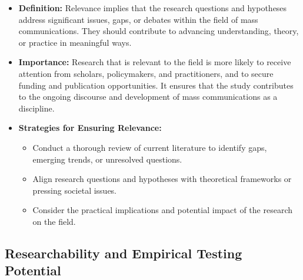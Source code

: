 \documentclass[
]{book}
\providecommand{\tightlist}{%
  \setlength{\itemsep}{0pt}\setlength{\parskip}{0pt}}
\begin{document}
\begin{itemize}
\item
  \textbf{Definition:} Relevance implies that the research questions and hypotheses address significant issues, gaps, or debates within the field of mass communications. They should contribute to advancing understanding, theory, or practice in meaningful ways.
\item
  \textbf{Importance:} Research that is relevant to the field is more likely to receive attention from scholars, policymakers, and practitioners, and to secure funding and publication opportunities. It ensures that the study contributes to the ongoing discourse and development of mass communications as a discipline.
\item
  \textbf{Strategies for Ensuring Relevance:}

  \begin{itemize}
  \tightlist
  \item
    Conduct a thorough review of current literature to identify gaps, emerging trends, or unresolved questions.
  \item
    Align research questions and hypotheses with theoretical frameworks or pressing societal issues.
  \item
    Consider the practical implications and potential impact of the research on the field.
  \end{itemize}
\end{itemize}

\hypertarget{researchability-and-empirical-testing-potential}{%
\subsection*{Researchability and Empirical Testing Potential}\label{researchability-and-empirical-testing-potential}}
\end{document}
